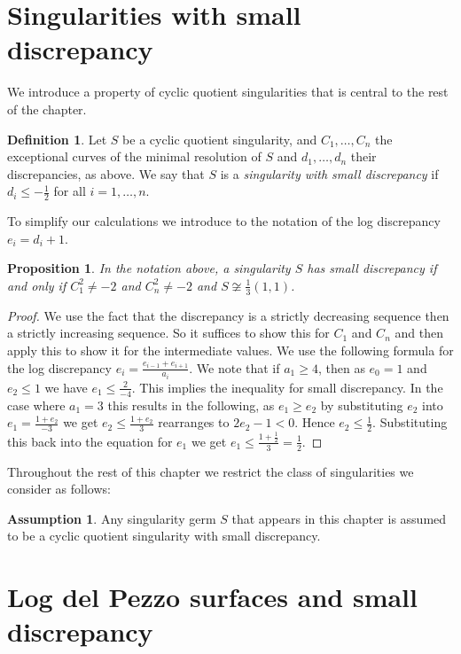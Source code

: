\documentclass[12pt,a4paper]{book}      %
\newtheorem{prop}[thm]{Proposition}
\theoremstyle{definition}
\newtheorem{dfn}[thm]{Definition}
\newtheorem{assumption}[thm]{Assumption}
\begin{document}
\section{Singularities with small discrepancy}


We introduce a property of cyclic quotient singularities that is central to the rest of the chapter.
\begin{dfn}
Let $S$ be a cyclic quotient singularity, and $C_1, \dots ,C_n$ the exceptional curves of the minimal resolution of $S$ and $d_1, \dots,d_n$ their discrepancies, as above.
We say that $S$ is a \emph{singularity with small discrepancy} if $d_i \leq -\frac{1}{2}$ for
all $i=1,\dots,n$.
\end{dfn}

To simplify our calculations we introduce to the notation of the log discrepancy $e_i = d_i + 1$. 

\begin{prop}\label{small prop}
In the notation above,
a singularity $S$ has small discrepancy if and only if $C_1^2 \neq -2$ and $C_n^2 \neq -2$ and $ S \not\cong \frac{1}{3}(1,1)$.
\end{prop}
\begin{proof}
 We use the fact that the discrepancy is a strictly decreasing sequence then a strictly increasing sequence. So it suffices to show this for $C_1$ and $C_n$ and then apply this to show it for the intermediate values. We use the following formula for the log discrepancy $e_i =  \frac{e_{i-1}+e_{i+1}}{a_i}$. We note that if $a_1 \geq 4$, then as $e_0 = 1$ and $e_2 \leq 1$ we have $e_1 \leq \frac{2}{-4}$. This implies the inequality for small discrepancy. In the case where $a_1 = 3$ this results in the following, as $e_1 \geq e_2$ by substituting $e_2$ into $e_1 = \frac{1 + e_2}{-3}$ we get  $ e_2 \leq \frac{1 + e_2}{3}$ rearranges to $2e_2 - 1 < 0$. Hence $e_2 \leq \frac{1}{2}$. Substituting this back into the equation for $e_1$ we get $e_1 \leq  \frac{1+ \frac{1}{2}}{3} =  \frac{1}{2}$. 
 \end{proof}


Throughout the rest of this chapter we restrict the class of singularities we consider as follows:

\begin{assumption}
Any singularity germ $S$ that appears in this chapter is assumed to be a cyclic
quotient singularity with small discrepancy.
\end{assumption}

\section{Log del Pezzo surfaces and small discrepancy}
\end{document}
